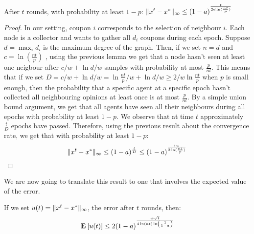\begin{theorem}
After $t$ rounds, with probability at least $1 - p$: $\| x^{t}-x^* \|_{\infty} \leq (1-a)^{\frac{t}{2d\ln( \frac{nt}{p})} }$
\end{theorem}
\begin{proof}
In our setting, coupon $i$ corresponds to the selection of neighbour $i$. Each node is a collector and wants to gather all $d_i$ coupons during each epoch. Suppose $d = \max_i d_i$ is the maximum degree of the graph. Then, if we set $n = d$ and $c = \ln (\frac{nt}{p})$ , using the previous lemma we get that a node hasn't seen at least one neigbour after $c/w + \ln d/w$ samples with probability at most $\frac{p}{nt}$. This means that if we set $D = c/w + \ln d/w =  \ln \frac{nt}{p}/w +  \ln d/w \geq 2/w\ln\frac{nt}{p} $ when $p$ is small enough, then the probability that a specific agent at a specific epoch hasn't collected all neighbouring opinions at least once is at most $\frac{p}{nt}$. By a simple union bound argument, we get that all agents have seen all their neighbours during all epochs with probability at least $1 - p$. We observe that at time $t$ approximately $\frac{t}{D}$ epochs have passed. Therefore, using the previous result about the convergence rate, we get that with probability at least $1 - p$:
$$ \| x^{t}-x^* \|_{\infty} \leq (1-a)^{\frac{t}{D}} \leq (1-a)^{\frac{tw}{2\ln( \frac{nt}{p})} }$$

\end{proof}
We are now going to translate this result to one that involves the expected value of the error.
\begin{theorem}If we set $u(t) = \| x^t-x^* \|_{\infty}$, the error after $t$ rounds, then:
$$
\Exp{u(t)} \leq 2(1-a)^{\frac{w\sqrt{t}}{4\ln(nt)\ln\lp( \frac{1}{1-a}\rp)}}
$$
\end{theorem}
